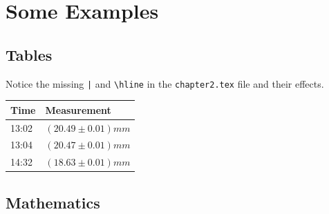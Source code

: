 \section{Some Examples}

\subsection{Tables}

Notice the missing \verb'|' and \verb|\hline| in the \verb|chapter2.tex| file and their effects.

\begin{table}[H]
    \begin{tabular}[b]{ || l | l  } %
        \hline %
        \textbf{Time} & \textbf{Measurement} \\\hline
        13:02 & $(20.49 \pm 0.01)\si{mm}$ \\\hline
        13:04 & $(20.47 \pm 0.01)\si{mm}$ \\%
        14:32 & $(18.63 \pm 0.01)\si{mm}$ \\\hline
    \end{tabular}
\end{table}

\subsection{Mathematics}

